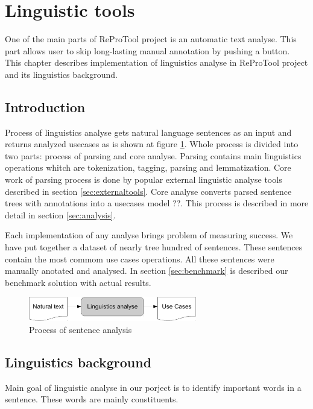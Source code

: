 \section{Linguistic tools}

One of the main parts of ReProTool project is an automatic text analyse. This part allows user to skip long-lasting manual annotation by pushing a button. This chapter describes implementation of linguistics analyse in ReProTool project and its linguistics background.

\subsection{Introduction}
Process of linguistics analyse gets natural language sentences as an input and returns analyzed usecases as is shown at figure \ref{fig:LinguisticsAnalyseSmall}. Whole process is divided into two parts: process of parsing and core analyse. Parsing contains main linguistics operations whitch are tokenization, tagging, parsing and lemmatization. Core work of parsing process is done by popular external linguistic analyse tools described in section \ref{sec:externaltools}. Core analyse converts parsed sentence trees with annotations into a usecases model ??. This process is described in more detail in section \ref{sec:analysis}. %

Each implementation of any analyse brings problem of measuring success. We have put together a dataset of nearly tree hundred of sentences. These sentences contain the most commom use cases operations. All these sentences were manually anotated and analysed. In section \ref{sec:benchmark} is described our benchmark solution with actual results.

\begin{figure}[ht]
  \centering
  \includegraphics[height=30pt]{images/LinguisticsAnalyseSmall}
  \caption{Process of sentence analysis}
  \label{fig:LinguisticsAnalyseSmall}
\end{figure}

\subsection{Linguistics background}

Main goal of linguistic analyse in our porject is to identify important words in a sentence. These words are mainly constituents.

